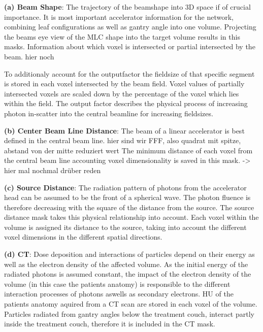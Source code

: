 \setlength{\hangingindent}{1em}

\begin{hangingpar}
    \item \textbf{(a) Beam Shape}: The trajectory of the beamshape into 3D space if of crucial importance. 
    It is most important accelerator information for the network, combining leaf configurations as well as gantry angle into one volume. 
    Projecting the beams eye view of the \acs{MLC} shape into the target volume results in this masks. 
    Information about which voxel is intersected or partial intersected by the beam. hier noch

    To additionaly account for the outputfactor the fieldsize of that specific segment is stored in each voxel intersected by the beam field. 
    Voxel values of partially intersected voxels are scaled down by the percentage of the voxel which lies within the field. 
    The output factor describes the physical process of increasing photon in-scatter into the central beamline for increasing fieldsizes. 
    
\end{hangingpar}

\begin{hangingpar}
    \item \textbf{(b) Center Beam Line Distance}: The beam of a linear accelerator is best defined in the central beam line.
    hier sind wir FFF,  also quadrat mit spitze, abstand von der mitte reduziert wert
    The minimum distance of each voxel from the central beam line accounting voxel dimensionality is saved in this mask. -> hier mal nochmal drüber reden
\end{hangingpar}

\begin{hangingpar}
    \item \textbf{(c) Source Distance}: 
    The radiation pattern of photons from the accelerator head can be assumed to be the front of a spherical wave. 
    The photon fluence is therefore decreasing with the square of the distance from the source. 
    The source distance mask takes this physical relationship into account. 
    Each voxel within the volume is assigned its distance to the source, taking into account the different voxel dimensions in the different spatial directions. 
    
\end{hangingpar}

\begin{hangingpar}
    \item \textbf{(d) CT}: 
    Dose deposition and interactions of particles depend on their energy as well as the electron density of the affected volume. 
    As the initial energy of the radiated photons is assumed constant, the impact of the electron density of the volume (in this case the patients anatomy) is responsible to the different interaction processes of photons aswells as secondary electrons. 
    \ac{HU} of the patients anatomy aquired from a \ac{CT} scan are stored in each voxel of the volume. 
    Particles radiated from gantry angles below the treatment couch, interact partly inside the treatment couch, therefore it is included in the \acs{CT} mask. 
\end{hangingpar}


